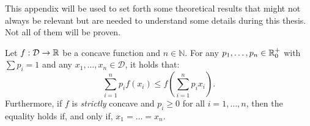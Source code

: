 \label{APPENDIX:A}

This appendix will be used to set forth some theoretical results that might not always be relevant but are needed to understand some details during this thesis. Not all of them will be proven.

\begin{nprop}\label{prop:jensen}
    Let $f:\mathcal D \to \mathbb{R}$ be a concave function and $n\in \mathbb N$. For any $p_1,\dots,p_n \in \mathbb{R}^+_0$ with $\sum p_i = 1$ and any $x_1,\dots,x_n \in \mathcal D$, it holds that:
    $$
    \sum_{i = 1}^n p_i f(x_i) \leq f \left(\sum_{i=1}^n p_i x_i\right).
    $$
    Furthermore, if $f$ is \emph{strictly} concave and $p_i \geq 0$ for all $i  = 1,\dots,n$, then the equality holds if, and only if, $x_1 = \dots = x_n$.
\end{nprop}